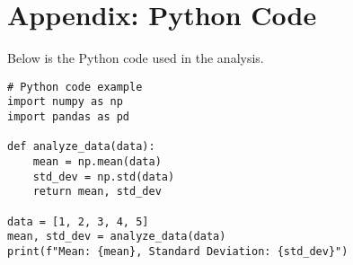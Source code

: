 \section{Appendix: Python Code}
Below is the Python code used in the analysis.

\begin{lstlisting}[caption=Python Code for Analysis]
# Python code example
import numpy as np
import pandas as pd

def analyze_data(data):
    mean = np.mean(data)
    std_dev = np.std(data)
    return mean, std_dev

data = [1, 2, 3, 4, 5]
mean, std_dev = analyze_data(data)
print(f"Mean: {mean}, Standard Deviation: {std_dev}")
\end{lstlisting}
